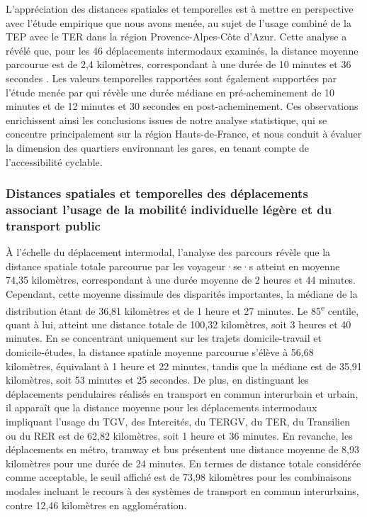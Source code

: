 \begin{refsegment}
L'appréciation des distances spatiales et temporelles est à mettre en perspective avec l'étude empirique que nous avons menée, au sujet de l'usage combiné de la \acrshort{TEP} avec le \acrshort{TER} dans la région Provence-Alpes-Côte d'Azur. Cette analyse a révélé que, pour les 46 déplacements intermodaux examinés, la distance moyenne parcourue est de 2,4 kilomètres, correspondant à une durée de 10 minutes et 36 secondes \textcolor{blue}{\autocite[186]{moinse_intermodal_2022}}. Les valeurs temporelles rapportées sont également supportées par l'étude menée par \textcolor{blue}{\textcite[268]{krygsman_multimodal_2004}} qui révèle une durée médiane en pré-acheminement de 10 minutes et de 12 minutes et 30 secondes en post-acheminement. Ces observations enrichissent ainsi les conclusions issues de notre analyse statistique, qui se concentre principalement sur la région Hauts-de-France, et nous conduit à évaluer la dimension des quartiers environnant les gares, en tenant compte de l'accessibilité cyclable.%

\subsubsection*{Distances spatiales et temporelles des déplacements associant l'usage de la mobilité individuelle légère et du transport public
    \label{chap5:distances-totales}
    }
    
À l'échelle du déplacement intermodal, l'analyse des parcours révèle que la distance spatiale totale parcourue par les voyageur·se·s atteint en moyenne 74,35 kilomètres, correspondant à une durée moyenne de 2 heures et 44 minutes. Cependant, cette moyenne dissimule des disparités importantes, la médiane de la distribution étant de 36,81 kilomètres et de 1 heure et 27 minutes. Le 85\textsuperscript{e} centile, quant à lui, atteint une distance totale de 100,32 kilomètres, soit 3 heures et 40 minutes. En se concentrant uniquement sur les trajets domicile-travail et domicile-études, la distance spatiale moyenne parcourue s'élève à 56,68 kilomètres, équivalant à 1 heure et 22 minutes, tandis que la médiane est de 35,91 kilomètres, soit 53 minutes et 25 secondes. De plus, en distinguant les déplacements pendulaires réalisés en transport en commun interurbain et urbain, il apparaît que la distance moyenne pour les déplacements intermodaux impliquant l'usage du \acrshort{TGV}, des Intercités, du \acrshort{TERGV}, du \acrshort{TER}, du Transilien ou du \acrfull{RER} est de 62,82 kilomètres, soit 1 heure et 36 minutes. En revanche, les déplacements en métro, tramway et bus présentent une distance moyenne de 8,93 kilomètres pour une durée de 24 minutes. En termes de distance totale considérée comme acceptable, le seuil affiché est de 73,98 kilomètres pour les combinaisons modales incluant le recours à des systèmes de transport en commun interurbains, contre 12,46 kilomètres en agglomération.%


\end{refsegment}
